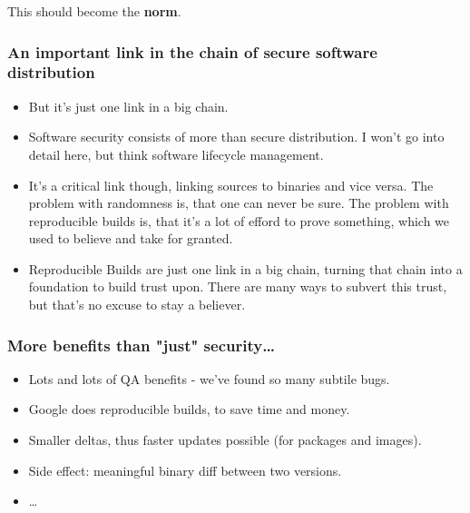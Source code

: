 \documentclass[14pt,aspectratio=169]{beamer}
\newif\ifplacelogo
\begin{document}
\placelogofalse

\begin{frame}[plain]
\begin{center}
 \Huge{This should become the \textbf{norm}.}

\end{center}
\end{frame}

\begin{frame}[fragile]
 \frametitle{An important link in the chain of secure software distribution}
 \begin{itemize}
  \item But it's just one link in a big chain.
  \item Software security consists of more than secure distribution. I won't go into detail here, but think software lifecycle management.
  \item<2> It's a critical link though, linking sources to binaries and vice versa. The problem with randomness is, that one can never be sure. The problem with reproducible builds is, that it's a lot of efford to prove something, which we used to believe and take for granted.
  \item<2> Reproducible Builds are just one link in a big chain, turning that chain into a foundation to build trust upon. There are many ways to subvert this trust, but that's no excuse to stay a believer.
 \end{itemize}
\end{frame}


\begin{frame}[fragile]
 \frametitle{More benefits than "just" security…}
 \begin{itemize}
  \item Lots and lots of QA benefits - we've found so many subtile bugs.
  \item<2-5> Google does reproducible builds, to save time and money.
  \item<3-5> Smaller deltas, thus faster updates possible (for packages and
  images).
  \item<4-5> Side effect: meaningful binary diff between two versions.
  \item<5> …
 \end{itemize}
\end{frame}
\end{document}
